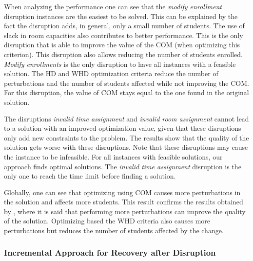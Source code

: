 \documentclass[twocolumn,natbib]{svjour3}          %
\newcounter{constraint}
\begin{document}
When analyzing the performance one can see that the \textit{modify enrollment} disruption instances are the easiest to be solved. This can be explained by the fact the disruption adds, in general, only a small number of students. The use of slack in room capacities also contributes to better performance. This is the only disruption that is able to improve the value of the COM (when optimizing this criterion). This disruption also allows reducing the number of students enrolled. \textit{Modify enrollments} is the only disruption to have all instances with a feasible solution. The HD and WHD optimization criteria reduce the number of perturbations and the number of students affected while not improving the COM. For this disruption, the value of COM stays equal to the one found in the original solution.

The disruptions \textit{invalid time assignment} and \textit{invalid room assignment} cannot lead to a solution with an improved optimization value, given that these disruptions only add new constraints to the problem. The results show that the quality of the solution gets worse with these disruptions. Note that these disruptions may cause the instance to be infeasible. For all instances with feasible solutions, our approach finds optimal solutions. The \textit{invalid time assignment} disruption is the only one to reach the time limit before finding a solution. 

Globally, one can see that optimizing using COM causes more perturbations in the solution and affects more students. This result confirms the results obtained by \cite{LINDAHL2019}, where it is said that performing more perturbations can improve the quality of the solution. Optimizing based the WHD criteria also causes more perturbations but reduces the number of students affected by the change.  



\subsubsection{Incremental Approach for Recovery after Disruption}
\end{document}
